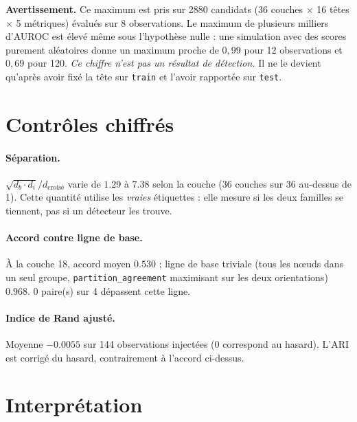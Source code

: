 \documentclass[11pt,a4paper]{article}
\begin{document}
\textbf{Avertissement.} Ce maximum est pris sur 2880 candidats
(36 couches $\times$ 16 têtes
$\times$ 5 métriques) évalués sur 8
observations. Le maximum de plusieurs milliers d'AUROC est élevé même sous
l'hypothèse nulle : une simulation avec des scores purement aléatoires donne
un maximum proche de $0{,}99$ pour 12 observations et $0{,}69$ pour 120.
\emph{Ce chiffre n'est pas un résultat de détection.} Il ne le devient
qu'après avoir fixé la tête sur \texttt{train} et l'avoir rapportée sur
\texttt{test}.


\section{Contrôles chiffrés}


\paragraph{Séparation.} $\sqrt{d_b \cdot d_i} / d_{\text{croisé}}$ varie
de $1.29$ à $7.38$ selon la couche
(36 couches sur 36 au-dessus de 1).
Cette quantité utilise les \emph{vraies} étiquettes : elle mesure si les deux
familles se tiennent, pas si un détecteur les trouve.



\paragraph{Accord contre ligne de base.} À la couche 18, accord moyen
$0.530$ ; ligne de base triviale (tous les n\oe uds dans
un seul groupe, \texttt{partition\_agreement} maximisant sur les deux
orientations) $0.968$.
0 paire(s) sur 4 dépassent cette ligne.



\paragraph{Indice de Rand ajusté.} Moyenne $-0.0055$ sur
144 observations injectées (0 correspond au hasard). L'ARI est corrigé
du hasard, contrairement à l'accord ci-dessus.


\section{Interprétation}


\end{document}
